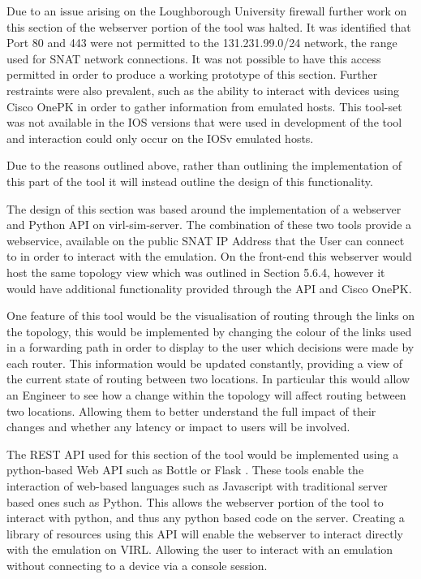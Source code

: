 \documentclass[11pt]{report}
\begin{document}
Due to an issue arising on the Loughborough University firewall further work on this section of the webserver portion of the tool was halted. It was identified that Port 80 and 443 were not permitted to the 131.231.99.0/24 network, the range used for SNAT network connections. It was not possible to have this access permitted in order to produce a working prototype of this section. Further restraints were also prevalent, such as the ability to interact with devices using Cisco OnePK in order to gather information from emulated hosts. This tool-set was not available in the IOS versions that were used in development of the tool and interaction could only occur on the IOSv emulated hosts.

Due to the reasons outlined above, rather than outlining the implementation of this part of the tool it will instead outline the design of this functionality.

The design of this section was based around the implementation of a webserver and Python API on virl-sim-server. The combination of these two tools provide a webservice, available on the public SNAT IP Address that the User can connect to in order to interact with the emulation. On the front-end this webserver would host the same topology view which was outlined in Section 5.6.4, however it would have additional functionality provided through the API and Cisco OnePK.

One feature of this tool would be the visualisation of routing through the links on the topology, this would be implemented by changing the colour of the links used in a forwarding path in order to display to the user which decisions were made by each router. This information would be updated constantly, providing a view of the current state of routing between two locations. In particular this would allow an Engineer to see how a change within the topology will affect routing between two locations. Allowing them to better understand the full impact of their changes and whether any latency or impact to users will be involved.

The REST API used for this section of the tool would be implemented using a python-based Web API such as Bottle \citep{Bottle} or Flask \citep{Flask}. These tools enable the interaction of web-based languages such as Javascript with traditional server based ones such as Python. This allows the webserver portion of the tool to interact with python, and thus any python based code on the server. Creating a library of resources using this API will enable the webserver to interact directly with the emulation on VIRL. Allowing the user to interact with an emulation without connecting to a device via a console session.
\end{document}
